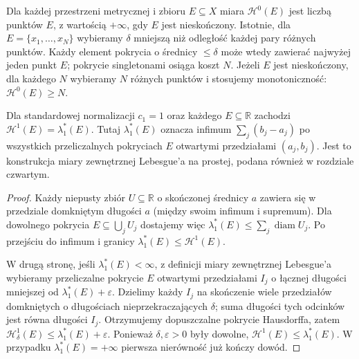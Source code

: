 \begin{przyklad}
\label{prz:hausdorff-counting-26}
Dla każdej przestrzeni metrycznej i zbioru $E\subseteq X$
miara $\mathcal H^0(E)$ jest liczbą punktów $E$,
z wartością $+\infty$, gdy $E$ jest nieskończony.
Istotnie, dla $E=\{x_1,\ldots,x_N\}$
wybieramy $\delta$ mniejszą niż odległość
każdej pary różnych punktów.
Każdy element pokrycia o średnicy $\leq\delta$
może wtedy zawierać najwyżej jeden punkt $E$;
pokrycie singletonami osiąga koszt $N$.
Jeżeli $E$ jest nieskończony, dla każdego $N$
wybieramy $N$ różnych punktów i stosujemy
monotoniczność: $\mathcal H^0(E)\geq N$.
\end{przyklad}

\begin{twierdzenie}
\label{thm:hausdorff-line-26}
Dla standardowej normalizacji $c_1=1$ oraz
każdego $E\subseteq\mathbb R$ zachodzi
$\mathcal H^1(E)=\lambda_1^*(E)$.
Tutaj $\lambda_1^*(E)$ oznacza infimum
$\sum_j(b_j-a_j)$ po wszystkich przeliczalnych
pokryciach $E$ otwartymi przedziałami $(a_j,b_j)$.
Jest to konstrukcja miary zewnętrznej Lebesgue'a
na prostej, podana również w rozdziale czwartym.
\end{twierdzenie}
\begin{proof}
Każdy niepusty zbiór $U\subseteq\mathbb R$
o skończonej średnicy $a$ zawiera się w przedziale
domkniętym długości $a$ (między swoim infimum
i supremum). Dla dowolnego pokrycia
$E\subseteq\bigcup_jU_j$ dostajemy więc
$\lambda_1^*(E)\leq\sum_j\operatorname{diam}U_j$.
Po przejściu do infimum i granicy
$\lambda_1^*(E)\leq\mathcal H^1(E)$.

W drugą stronę, jeśli $\lambda_1^*(E)<\infty$,
z definicji miary zewnętrznej Lebesgue'a
wybieramy przeliczalne pokrycie $E$ otwartymi
przedziałami $I_j$ o łącznej długości
mniejszej od $\lambda_1^*(E)+\varepsilon$.
Dzielimy każdy $I_j$ na skończenie wiele
przedziałów domkniętych o długościach
nieprzekraczających $\delta$; suma długości
tych odcinków jest równa długości $I_j$.
Otrzymujemy dopuszczalne pokrycie Hausdorffa,
zatem $\mathcal H^1_\delta(E)\leq
\lambda_1^*(E)+\varepsilon$.
Ponieważ $\delta,\varepsilon>0$ były dowolne,
$\mathcal H^1(E)\leq\lambda_1^*(E)$.
W przypadku $\lambda_1^*(E)=+\infty$
pierwsza nierówność już kończy dowód.
\end{proof}

